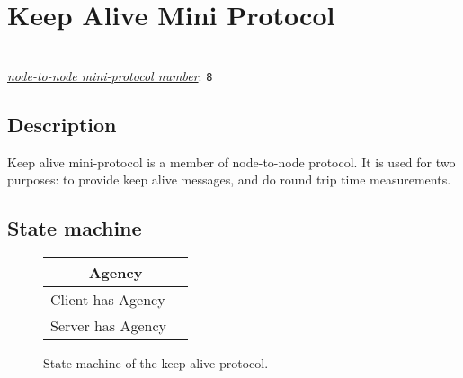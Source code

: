 \section{Keep Alive Mini Protocol}
\\
\hyperref[table:node-to-node-protocol-numbers]{\textit{node-to-node mini-protocol number}}: \texttt{8}\\

\label{keep-alive-protocol}
\subsection{Description}
Keep alive mini-protocol is a member of node-to-node protocol.  It is used for
two purposes: to provide keep alive messages, and do round trip time
measurements.

\newcommand{\Client}{\state{StClient}}
\newcommand{\Server}{\state{StServer}}
\newcommand{\MsgKeepAlive}{\trans{MsgKeepAlive}}
\newcommand{\MsgKeepAliveResponse}{\trans{MsgKeepAliveResponse}}
\subsection{State machine}

\begin{figure}[h]
  \begin{tabular}{|l|l|}
    \hline
    \multicolumn{2}{|c|}{Agency} \\ \hline
    Client has Agency & \Client  \\ \hline
    Server has Agency & \Server  \\ \hline
  \end{tabular}
\end{figure}

\begin{figure}[h]
  \caption{State machine of the keep alive protocol.}
\end{figure}

